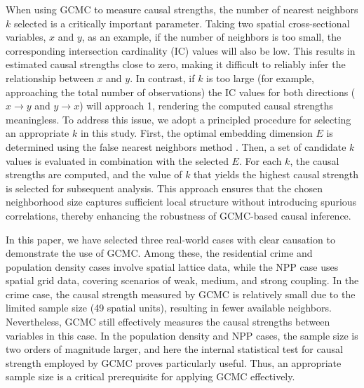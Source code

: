 \documentclass[authoryear,preprint,review,12pt]{elsarticle}
\begin{document}
When using GCMC to measure causal strengths, the number of nearest neighbors \(k\) selected is a critically important parameter. Taking two spatial cross-sectional variables, \(x\) and \(y\), as an example, if the number of neighbors is too small, the corresponding intersection cardinality (IC) values will also be low. This results in estimated causal strengths close to zero, making it difficult to reliably infer the relationship between \(x\) and \(y\). In contrast, if \(k\) is too large (for example, approaching the total number of observations) the IC values for both directions (\(x \to y\) and \(y \to x\)) will approach 1, rendering the computed causal strengths meaningless. To address this issue, we adopt a principled procedure for selecting an appropriate \(k\) in this study. First, the optimal embedding dimension \(E\) is determined using the false nearest neighbors method \citep{kennel1992fnn}. Then, a set of candidate \(k\) values is evaluated in combination with the selected \(E\). For each \(k\), the causal strengths are computed, and the value of \(k\) that yields the highest causal strength is selected for subsequent analysis. This approach ensures that the chosen neighborhood size captures sufficient local structure without introducing spurious correlations, thereby enhancing the robustness of GCMC-based causal inference.

In this paper, we have selected three real-world cases with clear causation to demonstrate the use of GCMC. Among these, the residential crime and population density cases involve spatial lattice data, while the NPP case uses spatial grid data, covering scenarios of weak, medium, and strong coupling. In the crime case, the causal strength measured by GCMC is relatively small due to the limited sample size (49 spatial units), resulting in fewer available neighbors. Nevertheless, GCMC still effectively measures the causal strengths between variables in this case. In the population density and NPP cases, the sample size is two orders of magnitude larger, and here the internal statistical test for causal strength employed by GCMC proves particularly useful. Thus, an appropriate sample size is a critical prerequisite for applying GCMC effectively.
\end{document}
